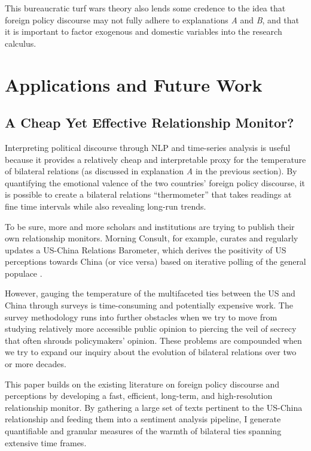 \documentclass[12pt,letterpaper]{article}
\begin{document}
This bureaucratic turf wars theory also lends some credence to the idea that foreign policy discourse may not fully adhere to explanations \emph{A} and \emph{B}, and that it is important to factor exogenous and domestic variables into the research calculus.

\section{Applications and Future Work}
\label{sec:future}

\subsection{A Cheap Yet Effective Relationship Monitor?}

Interpreting political discourse through NLP and time-series analysis is useful because it provides a relatively cheap and interpretable proxy for the temperature of bilateral relations (as discussed in explanation \emph{A} in the previous section). By quantifying the emotional valence of the two countries' foreign policy discourse, it is possible to create a bilateral relations ``thermometer'' that takes readings at fine time intervals while also revealing long-run trends.

To be sure, more and more scholars and institutions are trying to publish their own relationship monitors. Morning Consult, for example, curates and regularly updates a US-China Relations Barometer, which derives the positivity of US perceptions towards China (or vice versa) based on iterative polling of the general populace \autocite{morningconsult}. 

However, gauging the temperature of the multifaceted ties between the US and China through surveys is time-consuming and potentially expensive work. The survey methodology runs into further obstacles when we try to move from studying relatively more accessible public opinion to piercing the veil of secrecy that often shrouds policymakers' opinion. These problems are compounded when we try to expand our inquiry about the evolution of bilateral relations over two or more decades.

This paper builds on the existing literature on foreign policy discourse and perceptions by developing a fast, efficient, long-term, and high-resolution relationship monitor. By gathering a large set of texts pertinent to the US-China relationship and feeding them into a sentiment analysis pipeline, I generate quantifiable and granular measures of the warmth of bilateral ties spanning extensive time frames.
\end{document}
